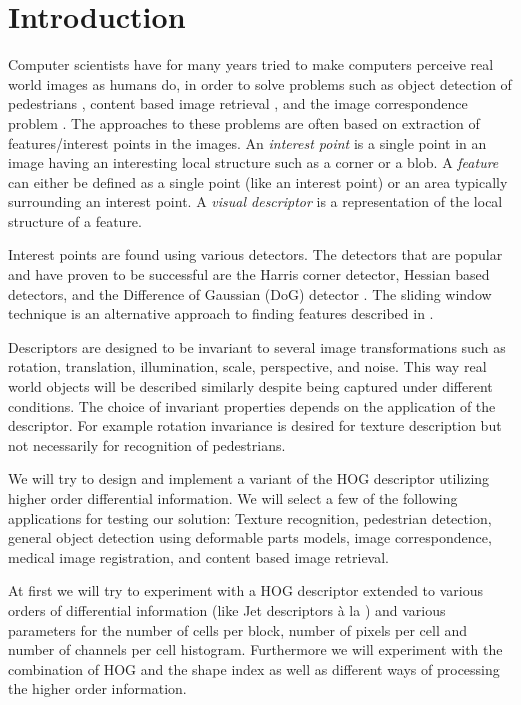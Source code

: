 \documentclass[../thesis.tex]{subfiles}
\begin{document}
\section{Introduction}

Computer scientists have for many years tried to make computers perceive real
world images as humans do, in order to solve problems such as
object detection of pedestrians \cite{felzenszwalb2008discriminatively},
content based image retrieval \cite{smeulders2000content}, and
the image correspondence problem \cite{dahl2011finding}.
%
The approaches to these problems are often based on extraction of
features/interest points in the images.
An \emph{interest point} is a single point in an image having an interesting local
structure such as a corner or a blob. A \emph{feature} can either be defined as a
single point (like an interest point) or an area typically surrounding an
interest point. A \emph{visual descriptor} is a representation of the local structure
of a feature. 

Interest points are found using various detectors. The detectors that are
popular and have proven to be successful are the Harris corner detector, Hessian
based detectors, and the Difference of Gaussian (DoG) detector
\cite{aanaes2012interesting}. The sliding window technique is an alternative
approach to finding features described in \cite{dalal2005histograms}.

Descriptors are designed to be invariant to several image transformations such
as rotation, translation, illumination, scale, perspective, and noise. This way
real world objects will be described similarly despite being captured under
different conditions. The choice of invariant properties depends on the
application of the descriptor. For example rotation invariance is desired for
texture description but not necessarily for recognition of pedestrians.

We will try to design and implement a variant of the HOG descriptor utilizing
higher order differential information. We
will select a few of the following applications for testing our solution:
Texture recognition, pedestrian detection, general object detection using
deformable parts models, image correspondence, medical image registration, and
content based image retrieval.

At first we will try to experiment with a HOG descriptor extended to
various orders of differential information (like Jet descriptors à la
\cite{larsen2012jet}) and various parameters for the number of cells per
block, number of pixels per cell and number of channels per cell histogram.
Furthermore we will experiment with the combination of HOG and the shape index
\cite{koenderink1992surface} as well as different ways of processing the
higher order information.



\subbibliography
\end{document}
